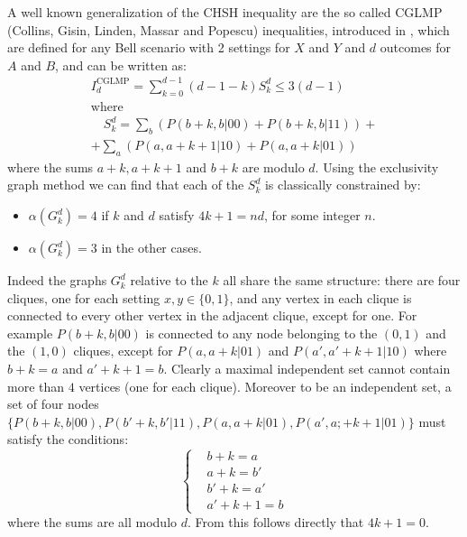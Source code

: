 \documentclass[letterpaper]{article}
\begin{document}
A well known generalization of the CHSH inequality are the so called CGLMP
(Collins, Gisin, Linden, Massar and Popescu) inequalities, introduced
in \cite{cglmp}, which are defined for any Bell scenario with 2 settings
for $X$ and $Y$ and $d$ outcomes for $A$ and $B$, and can be written as:
\begin{gather}
    I_d^{\mathrm{CGLMP}} = \sum_{k=0}^{d-1} (d-1-k) S^d_k \le 3 (d-1)\\ \nonumber
    \text{where}\\
    \quad S^d_k = \sum_b (P(b+k,b|00) + P(b+k, b | 11)) + \\ \nonumber
     + \sum_a (P(a, a+k+1|10) + P(a, a+k | 01))
    \label{eq:GCLMP}
\end{gather}
where the sums $a+k, a+k+1$ and $b+k$ are modulo $d$.
Using the exclusivity graph method we can find that each of the $S^d_k$ is
classically constrained by:
\begin{itemize}
    \item $\alpha(G^d_k) = 4$ if $k$ and $d$ satisfy $4k+1=n d$, for some
        integer $n$.
    \item $\alpha(G^d_k) = 3$ in the other cases.
\end{itemize}
Indeed the graphs $G^d_k$ relative to the $k$ all share the same
structure: there are four cliques, one for each setting $x,y \in \{0,1\}$,
and any vertex in each clique is connected to every other vertex in the
adjacent clique, except for one.  For example $P(b+k,b|00)$ is connected
to any node belonging to the $(0,1)$ and the $(1,0)$ cliques, except for
$P(a,a+k|01)$ and $P(a',a'+k+1|10)$ where $b+k = a$ and $a'+k+1 = b$.
Clearly a maximal independent set cannot contain more than $4$ vertices
(one for each clique).  Moreover to be an independent set, a set of four
nodes $\{P(b+k,b|00), P(b'+k,b'|11), P(a,a+k|01), P(a',a;+k+1|01)\}$
must satisfy the conditions:
\begin{equation}
    \left\{
        \begin{aligned}
            &b + k = a \\
            &a + k = b' \\
            &b' + k = a' \\
            &a' + k + 1 = b 
        \end{aligned}
    \right.
    \label{eq:four_indipset_condition}
\end{equation}
where the sums are all modulo $d$.
From this follows directly that $4k+1 = 0$. 
\end{document}
